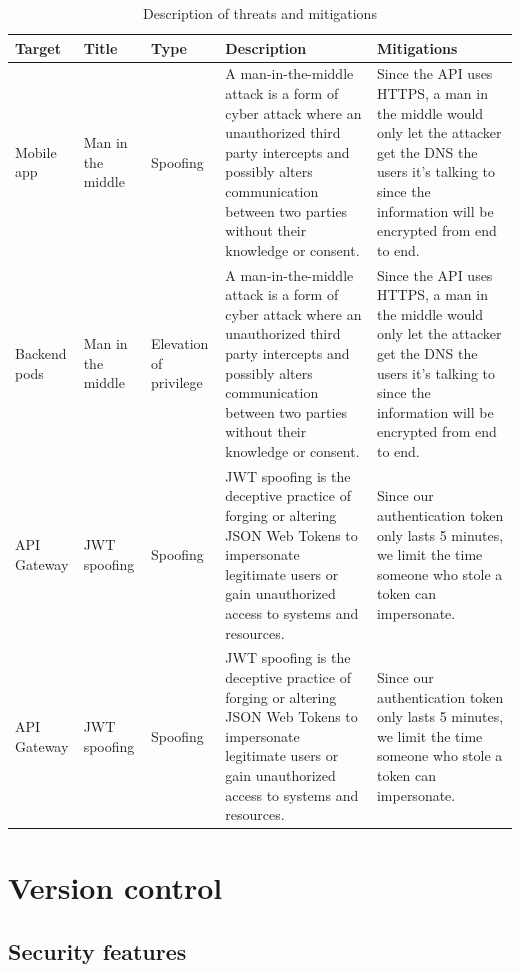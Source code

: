 \documentclass[12pt,x11names]{article}
\begin{document}
\begin{table}[htbp] %
  \centering
  \small %
  \begin{tabular}{|p{2.5cm}|p{2.5cm}|p{2.5cm}|p{4cm}|p{4cm}|}
  \hline
  \textbf{Target} & \textbf{Title} & \textbf{Type} & \textbf{Description} & \textbf{Mitigations} \\ 
  \hline
  Mobile app & Man in the middle & Spoofing & A man-in-the-middle attack is a form of cyber attack where an unauthorized third party intercepts and possibly alters communication between two parties without their knowledge or consent. & Since the API uses HTTPS, a man in the middle would only let the attacker get the DNS the users it's talking to since the information will be encrypted from end to end. \\ 
  \hline
  Backend pods & Man in the middle & Elevation of privilege & A man-in-the-middle attack is a form of cyber attack where an unauthorized third party intercepts and possibly alters communication between two parties without their knowledge or consent. & Since the API uses HTTPS, a man in the middle would only let the attacker get the DNS the users it's talking to since the information will be encrypted from end to end. \\ 
  \hline
  API Gateway & JWT spoofing & Spoofing & JWT spoofing is the deceptive practice of forging or altering JSON Web Tokens to impersonate legitimate users or gain unauthorized access to systems and resources. & Since our authentication token only lasts 5 minutes, we limit the time someone who stole a token can impersonate. \\ 
  \hline
  API Gateway & JWT spoofing & Spoofing & JWT spoofing is the deceptive practice of forging or altering JSON Web Tokens to impersonate legitimate users or gain unauthorized access to systems and resources. & Since our authentication token only lasts 5 minutes, we limit the time someone who stole a token can impersonate. \\ 
  \hline
  \end{tabular}
  \caption{Description of threats and mitigations}
\end{table}

\bigskip

\section{Version control}

\subsection{Security features}
\end{document}
